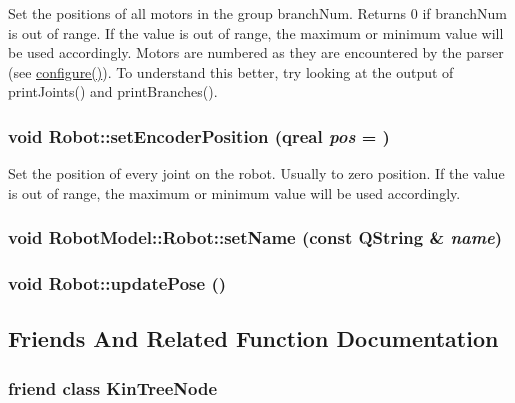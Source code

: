 Set the positions of all motors in the group branchNum. Returns 0 if branchNum is out of range. If the value is out of range, the maximum or minimum value will be used accordingly. Motors are numbered as they are encountered by the parser (see \hyperlink{class_robot_model_1_1_robot_a9ca9887b212f3233d101d95854cf2c79}{configure()}). To understand this better, try looking at the output of printJoints() and printBranches(). \hypertarget{class_robot_model_1_1_robot_a72ff62b72e0e9d34d3ca0c241dec50d3}{
\subsubsection[{setEncoderPosition}]{\setlength{\rightskip}{0pt plus 5cm}void Robot::setEncoderPosition (qreal {\em pos} = {})}}
\label{class_robot_model_1_1_robot_a72ff62b72e0e9d34d3ca0c241dec50d3}


Set the position of every joint on the robot. Usually to zero position. If the value is out of range, the maximum or minimum value will be used accordingly. \hypertarget{class_robot_model_1_1_robot_a0e3187d8a543ab03029138ea836ed546}{
\subsubsection[{setName}]{\setlength{\rightskip}{0pt plus 5cm}void RobotModel::Robot::setName (const QString \& {\em name})}}
\label{class_robot_model_1_1_robot_a0e3187d8a543ab03029138ea836ed546}
\hypertarget{class_robot_model_1_1_robot_a7338994f0ab4baa6e5d08751272b63ca}{
\subsubsection[{updatePose}]{\setlength{\rightskip}{0pt plus 5cm}void Robot::updatePose ()}}
\label{class_robot_model_1_1_robot_a7338994f0ab4baa6e5d08751272b63ca}


\subsection{Friends And Related Function Documentation}
\hypertarget{class_robot_model_1_1_robot_a2133a69fbecb2cd6583a1439af3ab61c}{
\subsubsection[{KinTreeNode}]{\setlength{\rightskip}{0pt plus 5cm}friend class {\bf KinTreeNode}}}
\label{class_robot_model_1_1_robot_a2133a69fbecb2cd6583a1439af3ab61c}


